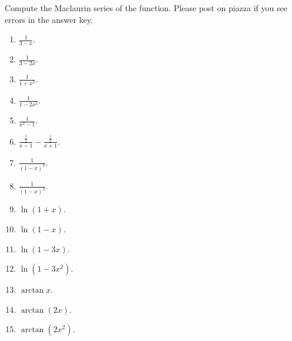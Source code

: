 Compute the Maclaurin series of the function. Please post on piazza if you see errors in the answer key.
\begin{multicols}{2}
\begin{enumerate}
\item $\displaystyle \frac{1}{3-x}$.

\item $\displaystyle \frac{1}{3-2x}$.


\item $\displaystyle \frac{1}{1+x^2}$.

\item $\frac{1}{1-2x^2}$.
\item $\frac{1}{x^2-1}$.
\item $\frac{\frac12}{x-1}-\frac{\frac12}{x+1}$.
\item $ \frac{1}{(1-x)^2}$.
\item $ \frac{1}{(1-x)^3}$.
\item $\ln (1+x)$.
\item $\ln (1-x)$.
\item $\ln (1-3x)$.
\item $\ln (1-3x^2)$.
\item $\arctan x$.
\item $\arctan (2x)$.
\item $\arctan \left(2x^2\right)$.

\end{enumerate}
\end{multicols}